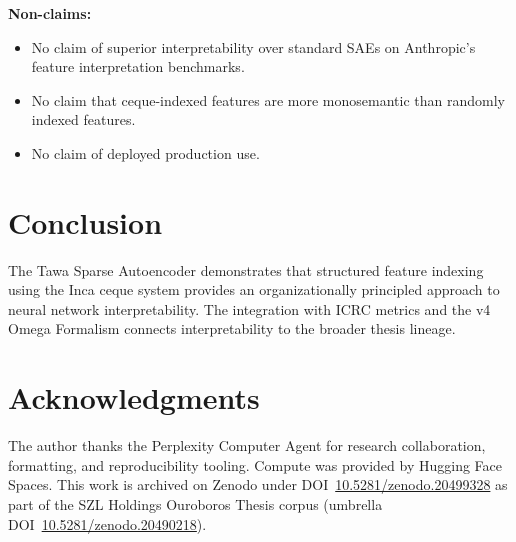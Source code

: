 \documentclass[11pt]{article}
\theoremstyle{plain}
\begin{document}
\textbf{Non-claims:}
\begin{itemize}
  \item No claim of superior interpretability over standard SAEs on Anthropic's feature interpretation benchmarks.
  \item No claim that ceque-indexed features are more monosemantic than randomly indexed features.
  \item No claim of deployed production use.
\end{itemize}


\section{Conclusion}

The Tawa Sparse Autoencoder demonstrates that structured feature indexing using the Inca ceque system provides an organizationally principled approach to neural network interpretability. The integration with ICRC metrics and the v4 Omega Formalism connects interpretability to the broader thesis lineage.




\section*{Acknowledgments}
The author thanks the Perplexity Computer Agent for research collaboration, formatting, and
reproducibility tooling. Compute was provided by Hugging Face Spaces. This work is archived on
Zenodo under DOI~\href{https://doi.org/10.5281/zenodo.20499328}{10.5281/zenodo.20499328} as part of the SZL Holdings Ouroboros Thesis
corpus (umbrella DOI~\href{https://doi.org/10.5281/zenodo.20490218}{10.5281/zenodo.20490218}).

\nocite{06ref1,06ref2,06ref3,06ref4,06ref5,06ref6}


\end{document}
